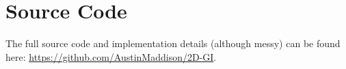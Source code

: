 \documentclass[acmtog, nonacm]{acmart}
\begin{document}
\section{Source Code}
\label{sec:sourcecode}
The full source code and implementation details (although messy) can be found here: \url{https://github.com/AustinMaddison/2D-GI}.







\end{document}

